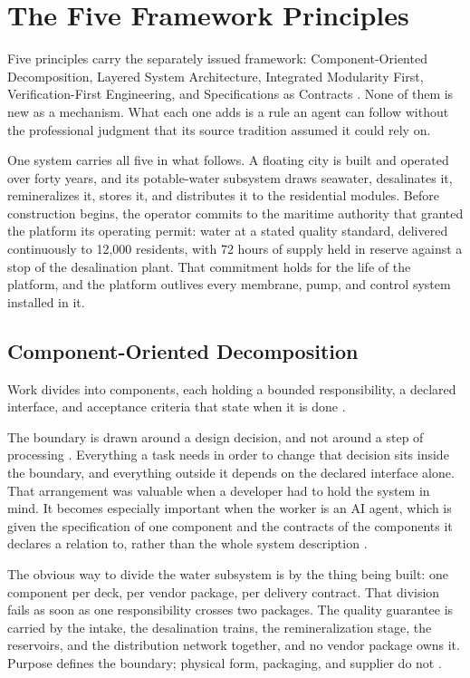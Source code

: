 \section{The Five Framework Principles}\label{sec:principles}

Five principles carry the separately issued framework: Component-Oriented Decomposition, Layered System Architecture, Integrated Modularity First, Verification-First Engineering, and Specifications as Contracts \citep{tbf2026}. None of them is new as a mechanism. What each one adds is a rule an agent can follow without the professional judgment that its source tradition assumed it could rely on.

One system carries all five in what follows. A floating city is built and operated over forty years, and its potable-water subsystem draws seawater, desalinates it, remineralizes it, stores it, and distributes it to the residential modules. Before construction begins, the operator commits to the maritime authority that granted the platform its operating permit: water at a stated quality standard, delivered continuously to 12,000 residents, with 72 hours of supply held in reserve against a stop of the desalination plant. That commitment holds for the life of the platform, and the platform outlives every membrane, pump, and control system installed in it.

\subsection{Component-Oriented Decomposition}

Work divides into components, each holding a bounded responsibility, a declared interface, and acceptance criteria that state when it is done \citep{tbf2026}.

The boundary is drawn around a design decision, and not around a step of processing \citep{parnas1972}. Everything a task needs in order to change that decision sits inside the boundary, and everything outside it depends on the declared interface alone. That arrangement was valuable when a developer had to hold the system in mind. It becomes especially important when the worker is an AI agent, which is given the specification of one component and the contracts of the components it declares a relation to, rather than the whole system description \citep[Section~\hyperlink{nss-6.3}{6.3}]{pss2026}.

The obvious way to divide the water subsystem is by the thing being built: one component per deck, per vendor package, per delivery contract. That division fails as soon as one responsibility crosses two packages. The quality guarantee is carried by the intake, the desalination trains, the remineralization stage, the reservoirs, and the distribution network together, and no vendor package owns it. Purpose defines the boundary; physical form, packaging, and supplier do not \citep[Section~\hyperlink{nss-5.2}{5.2}]{pss2026}.

